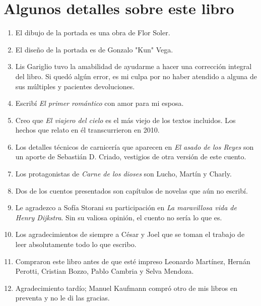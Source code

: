 \documentclass[11pt,twoside,openright]{book}
\begin{document}




























\cleardoublepage

{\small
\section*{Algunos detalles sobre este libro}

\begin{enumerate}
\item El dibujo de la portada es una obra de Flor Soler.
\item El diseño de la portada es de Gonzalo "Kun" Vega.
\item Lis Gariglio tuvo la amabilidad de ayudarme a hacer una corrección integral del libro. Si quedó algún error, es mi culpa por no haber atendido a alguna de sus múltiples y pacientes devoluciones.
\item Escribí \emph{El primer romántico} con amor para mi esposa.
\item Creo que \emph{El viajero del cielo} es el más viejo de los textos incluidos. Los hechos que  relato en él transcurrieron en 2010.
\item Los detalles técnicos de carnicería que aparecen en \emph{El asado de los Reyes} son un aporte de Sebastián D. Criado, vestigios de otra versión de este cuento.
\item Los protagonistas de \emph{Carne de los dioses} son Lucho, Martín y Charly.
\item Dos de los cuentos presentados son capítulos de novelas que aún no escribí.
\item Le agradezco a Sofía Storani su participación en \emph{La maravillosa vida de Henry Dijkstra}. Sin su valiosa opinión, el cuento no sería lo que es.
\item Los agradecimientos de siempre a César y Joel que se toman el trabajo de leer absolutamente todo lo que escribo.
\item Compraron este libro antes de que esté impreso Leonardo Martínez, Hernán Perotti, Cristian Bozzo, Pablo Cambria y Selva Mendoza.
\item Agradecimiento tardío; Manuel Kaufmann compró otro de mis libros en preventa y no le di las gracias.
\end{enumerate}
}
\end{document}
